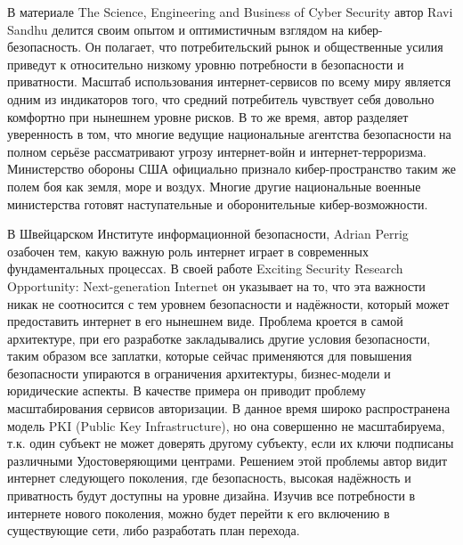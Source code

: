 \documentclass[10pt,a4paper]{article}
\begin{document}
\begin{multicols}{2}
В материале The Science, Engineering and Business of Cyber Security автор Ravi Sandhu делится своим опытом и оптимистичным взглядом на кибер-безопасность. Он полагает, что потребительский рынок и общественные усилия приведут к относительно низкому уровню потребности в безопасности и приватности. Масштаб использования интернет-сервисов по всему миру является одним из индикаторов того, что средний потребитель чувствует себя довольно комфортно при нынешнем уровне рисков.
В то же время, автор разделяет уверенность в том, что многие ведущие национальные агентства безопасности на полном серьёзе рассматривают угрозу интернет-войн и интернет-терроризма. Министерство обороны США официально признало кибер-пространство таким же полем боя как земля, море и воздух. Многие другие национальные военные министерства готовят наступательные и оборонительные кибер-возможности.


В Швейцарском Институте информационной безопасности, Adrian Perrig озабочен тем, какую важную роль интернет играет в современных фундаментальных процессах. В своей работе Exciting Security Research Opportunity: Next-generation Internet он указывает на то, что эта важности никак не соотносится с тем уровнем безопасности и надёжности, который может предоставить интернет в его нынешнем виде. Проблема кроется в самой архитектуре, при его разработке закладывались другие условия безопасности, таким образом все заплатки, которые сейчас применяются для повышения безопасности упираются в ограничения архитектуры, бизнес-модели и юридические аспекты.
В качестве примера он приводит проблему масштабирования сервисов авторизации. В данное время широко распространена модель PKI (Public Key Infrastructure), но она совершенно не масштабируема, т.к. один субъект не может доверять другому субъекту, если их ключи подписаны различными Удостоверяющими центрами.
Решением этой проблемы автор видит интернет следующего поколения, где безопасность, высокая надёжность и приватность будут доступны на уровне дизайна. Изучив все потребности в интернете нового поколения, можно будет перейти к его включению в существующие сети, либо разработать план перехода.
\end{multicols}
\end{document}
